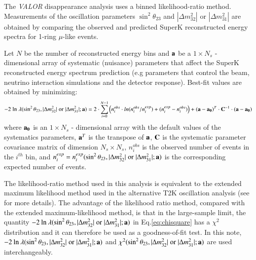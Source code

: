 The {\em VALOR} disappearance analysis uses a binned likelihood-ratio method.
Measurements of the oscillation parameters $\sin^{2}\theta_{23}$ and $|\Delta m^{2}_{32}|$ or $|\Delta m^{2}_{31}|$
are obtained by comparing the observed and predicted SuperK reconstructed energy spectra
for 1-ring $\mu$-like events.

Let $N$ be the number of reconstructed energy bins and
${\bf a}$ be a $1 \times N_{s}$ - dimensional array of systematic (nuisance) 
parameters that affect the SuperK reconstructed energy spectrum prediction (e.g
parameters that control the beam, neutrino interaction simulations and 
the detector response).
Best-fit values are obtained by minimizing: 
\begin{equation}
\displaystyle
-2 \; \textrm{ln} \; \lambda (\sin^{2}\theta_{23},|\Delta m^{2}_{32}| \; \textrm{or} \; |\Delta m^{2}_{31}|; {\bf a}) = 
  2 \cdot \sum_{i=0}^{N-1} 
   \Big( 
     n^{obs}_{i} \cdot ln(n^{obs}_{i}/n^{exp}_{i}) +
     (n^{exp}_{i}-n^{obs}_{i}) 
   \Big) +
   ({\bf a}-{\bf a_{0}})^{T} \cdot {\bf C}^{-1} \cdot ({\bf a}-{\bf a_{0}})
\label{eq:chisquare}
\end{equation}
where
${\bf a_{0}}$ is an $1 \times N_{s}$ - dimensional array with the default values of 
the systematics parameters, ${\bf a}^{T}$ is the transpose of ${\bf a}$,
${\bf C}$ is the systematic parameter covariance matrix of dimension $N_{s} \times N_{s}$,
$n^{obs}_{i}$ is the observed number of events in the $i^{th}$ bin, and
$n^{exp}_{i} = n^{exp}_{i}(\sin^{2}\theta_{23},|\Delta m^{2}_{32}| \; \textrm{or} \; |\Delta m^{2}_{31}|; {\bf a})$ 
is the corresponding expected number of events.

The likelihood-ratio method used in this analysis is equivalent to the extended maximum likelihood
method used in the alternative T2K oscillation analysis 
(see \cite{OurRun1DisappAnalysis,StatAnalysisCowan} for more details).
The advantage of the likelihood ratio method, compared with the extended maximum-likelihood method, is that
in the large-sample limit, the quantity $-2 \: \textrm{ln} \: \lambda (\sin^{2}\theta_{23},|\Delta m^{2}_{32}| \; \textrm{or} \; |\Delta m^{2}_{31}|; {\bf a})$
in Eq.\ref{eq:chisquare} has a $\chi^{2}$ distribution and it can therefore be used as a goodness-of-fit test.
In this note,
$-2 \: \textrm{ln} \: \lambda (\sin^{2}\theta_{23},|\Delta m^{2}_{32}| \; \textrm{or} \; |\Delta m^{2}_{31}|; {\bf a})$ and
$\chi^{2}(\sin^{2}\theta_{23},|\Delta m^{2}_{32}| \; \textrm{or} \; |\Delta m^{2}_{31}|; {\bf a})$ are used interchangeably.

